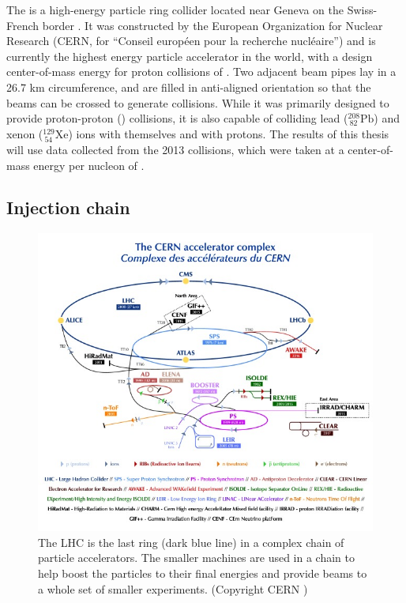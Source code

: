 The \lhc is a high-energy particle ring collider located near Geneva on the Swiss-French border \cite{LHCMachine}.
It was constructed by the European Organization for Nuclear Research (CERN, for ``Conseil européen pour la recherche nucléaire'') and is currently the highest energy particle accelerator in the world, with a design center-of-mass energy for proton collisions of \ppenergy.
Two adjacent beam pipes lay in a 26.7 km circumference, and are filled in anti-aligned orientation so that the beams can be crossed to generate collisions.
While it was primarily designed to provide proton-proton (\pp) collisions, it is also capable of colliding lead (${}^{208}_{\ 82}\textrm{Pb}$) and xenon (${}^{129}_{\ 54}\textrm{Xe}$) ions with themselves and with protons.
The results of this thesis will use data collected from the 2013 \pPb collisions, which were taken at a center-of-mass energy per nucleon of \pPbenergy.

\subsection{Injection chain}

\begin{figure}[t]
\includegraphics{CCC-v2018-print-v2.jpg}
\caption{The LHC is the last ring (dark blue line) in a complex chain of particle accelerators. The smaller machines are used in a chain to help boost the particles to their final energies and provide beams to a whole set of smaller experiments. (Copyright CERN \cite{Mobs:2636343})}
\label{fig:injection_chain}
\end{figure}

